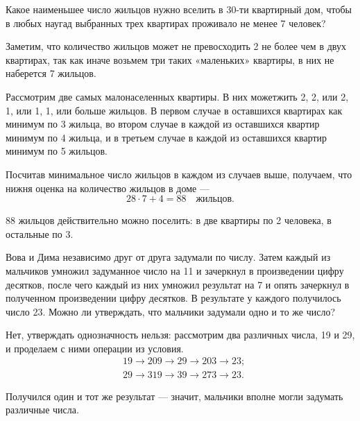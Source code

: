 
\begin{itemize}

	\itA Какое наименьшее число жильцов нужно вселить в 30-ти квартирный дом, чтобы в любых наугад выбранных трех квартирах проживало не менее 7 человек?
	
	\itr Заметим, что количество жильцов может не превосходить 2 не более чем в двух квартирах, так как иначе возьмем три таких «маленьких» квартиры, в них не наберется 7 жильцов.
	
	Рассмотрим две самых малонаселенных квартиры. В них может\linebreak жить 2, 2, или 2, 1, или 1, 1, или больше жильцов. В первом случае в оставшихся квартирах как минимум по 3 жильца, во втором случае в каждой из оставшихся квартир минимум по 4 жильца, и в третьем случае в каждой из оставшихся квартир минимум по 5 жильцов. 
	
	Посчитав минимальное число жильцов в каждом из случаев выше, получаем, что нижня оценка на количество жильцов в доме —
	$$28 \cdot 7 + 4 = 88\quad\text{жильцов.}$$
	
	88 жильцов действительно можно поселить: в две квартиры по 2 человека, в остальные по 3.

	\itB Вова и Дима независимо друг от друга задумали по числу. Затем каждый из мальчиков умножил задуманное число на 11 и зачеркнул в произведении цифру десятков, после чего каждый из них умножил результат на 7 и опять зачеркнул в полученном произведении цифру десятков. В результате у каждого получилось число 23. Можно ли утверждать, что мальчики задумали одно и то же число?
	
	\itr Нет, утверждать однозначность нельзя: рассмотрим два различных числа, 19 и 29, и проделаем с ними операции из условия.
\begin{align*}
	& 19 \rightarrow 209 \rightarrow  29 \rightarrow 203 \rightarrow 23; \\
	& 29 \rightarrow 319 \rightarrow 39 \rightarrow 273 \rightarrow 23.
\end{align*}

	Получился один и тот же результат — значит, мальчики вполне могли задумать различные числа.

\end{itemize}


